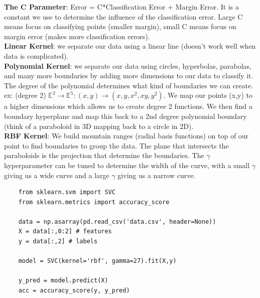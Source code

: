 \documentclass[11pt, a4paper]{article}
\begin{document}
\begin{spacing}{1.1}
	\textbf{The C Parameter}: Error = C*Classification Error + Margin Error. It is a constant we use to determine the influence of the classification error. Large C means focus on classifying points (smaller margin), small C means focus on margin error (makes more classification errors).\vspace*{2mm}\\
	\textbf{Linear Kernel}: we separate our data using a linear line (doesn't work well when data is complicated).\vspace*{2mm}\\
	\textbf{Polynomial Kernel}: we separate our data using circles, hyperbolas, parabolas, and many more boundaries by adding more dimensions to our data to classify it. The degree of the polynomial determines what kind of boundaries we can create.\vspace*{.5mm}\\
	ex: (degree 2) $\mathbb{E}^2 \rightarrow \mathbb{E}^5: (x,y) \rightarrow(x,y,x^2,xy,y^2)$. We map our points (x,y) to a higher dimensions which allows us to create degree 2 functions. We then find a boundary hyperplane and map this back to a 2nd degree polynomial boundary (think of a paraboloid in 3D mapping back to a circle in 2D). \vspace*{2mm}\\
	\textbf{RBF Kernel}: We build mountain ranges (radial basis functions) on top of our point to find boundaries to group the data. The plane that intersects the paraboloids is the projection that determine the boundaries. The $\gamma$ hyperparameter can be tuned to determine the width of the curve, with a small $\gamma$ giving us a wide curve and a large $\gamma$ giving us a narrow curve.
	\begin{lstlisting}
	from sklearn.svm import SVC
	from sklearn.metrics import accuracy_score
	
	data = np.asarray(pd.read_csv('data.csv', header=None)) 
	X = data[:,0:2] # features
	y = data[:,2] # labels
	
	model = SVC(kernel='rbf', gamma=27).fit(X,y)
	
	y_pred = model.predict(X)
	acc = accuracy_score(y, y_pred)
	\end{lstlisting} \newpage


\end{spacing}
\end{document}
